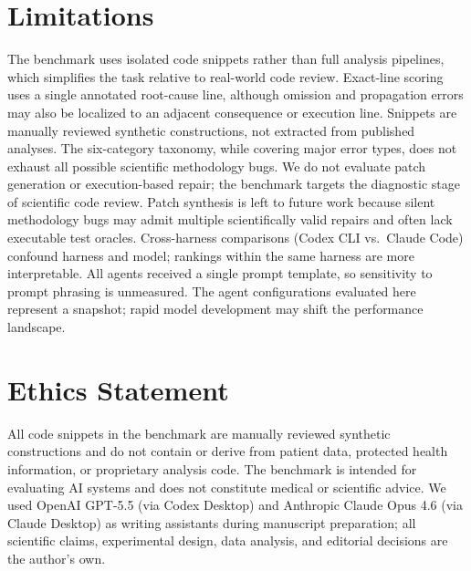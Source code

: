 \documentclass[11pt]{article}
\begin{document}
\section*{Limitations}

The benchmark uses isolated code snippets rather than full analysis pipelines, which simplifies the task relative to real-world code review. Exact-line scoring uses a single annotated root-cause line, although omission and propagation errors may also be localized to an adjacent consequence or execution line. Snippets are manually reviewed synthetic constructions, not extracted from published analyses. The six-category taxonomy, while covering major error types, does not exhaust all possible scientific methodology bugs. We do not evaluate patch generation or execution-based repair; the benchmark targets the diagnostic stage of scientific code review. Patch synthesis is left to future work because silent methodology bugs may admit multiple scientifically valid repairs and often lack executable test oracles. Cross-harness comparisons (Codex CLI vs.\ Claude Code) confound harness and model; rankings within the same harness are more interpretable. All agents received a single prompt template, so sensitivity to prompt phrasing is unmeasured. The agent configurations evaluated here represent a snapshot; rapid model development may shift the performance landscape.

\section*{Ethics Statement}

All code snippets in the benchmark are manually reviewed synthetic constructions and do not contain or derive from patient data, protected health information, or proprietary analysis code. The benchmark is intended for evaluating AI systems and does not constitute medical or scientific advice. We used OpenAI GPT-5.5 (via Codex Desktop) and Anthropic Claude Opus 4.6 (via Claude Desktop) as writing assistants during manuscript preparation; all scientific claims, experimental design, data analysis, and editorial decisions are the author's own.
\end{document}
